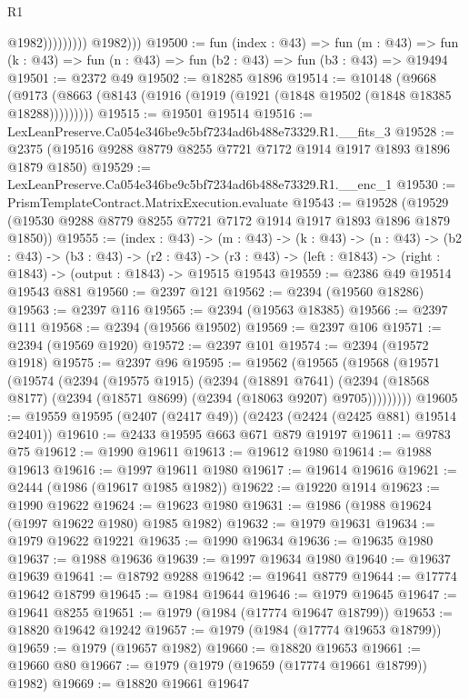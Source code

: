 \begin{lexlean}{R1}
\begin{coremodule}
                            @1982)))))))))
          @1982)))
@19500 := fun (index : @43) =>
  fun (m : @43) => fun (k : @43) => fun (n : @43) => fun (b2 : @43) => fun (b3 : @43) => @19494
@19501 := @2372 @49
@19502 := @18285 @1896
@19514 := @10148
    (@9668 (@9173 (@8663 (@8143 (@1916 (@1919 (@1921 (@1848 @19502 (@1848 @18385 @18288)))))))))
@19515 := @19501 @19514
@19516 := LexLeanPreserve.Ca054e346be9c5bf7234ad6b488e73329.R1.__fits_3
@19528 := @2375 (@19516 @9288 @8779 @8255 @7721 @7172 @1914 @1917 @1893 @1896 @1879 @1850)
@19529 := LexLeanPreserve.Ca054e346be9c5bf7234ad6b488e73329.R1.__enc_1
@19530 := PrismTemplateContract.MatrixExecution.evaluate
@19543 := @19528 (@19529 (@19530 @9288 @8779 @8255 @7721 @7172 @1914 @1917 @1893 @1896 @1879 @1850))
@19555 := (index : @43) ->
  (m : @43) ->
  (k : @43) ->
  (n : @43) ->
  (b2 : @43) ->
  (b3 : @43) ->
  (r2 : @43) -> (r3 : @43) -> (left : @1843) -> (right : @1843) -> (output : @1843) -> @19515 @19543
@19559 := @2386 @49 @19514 @19543 @881
@19560 := @2397 @121
@19562 := @2394 (@19560 @18286)
@19563 := @2397 @116
@19565 := @2394 (@19563 @18385)
@19566 := @2397 @111
@19568 := @2394 (@19566 @19502)
@19569 := @2397 @106
@19571 := @2394 (@19569 @1920)
@19572 := @2397 @101
@19574 := @2394 (@19572 @1918)
@19575 := @2397 @96
@19595 := @19562
    (@19565
      (@19568
        (@19571
          (@19574
            (@2394
              (@19575 @1915)
              (@2394
                (@18891 @7641)
                (@2394 (@18568 @8177) (@2394 (@18571 @8699) (@2394 (@18063 @9207) @9705)))))))))
@19605 := @19559 @19595 (@2407 (@2417 @49)) (@2423 (@2424 (@2425 @881) @19514 @2401))
@19610 := @2433 @19595 @663 @671 @879 @19197
@19611 := @9783 @75
@19612 := @1990 @19611
@19613 := @19612 @1980
@19614 := @1988 @19613
@19616 := @1997 @19611 @1980
@19617 := @19614 @19616
@19621 := @2444 (@1986 (@19617 @1985 @1982))
@19622 := @19220 @1914
@19623 := @1990 @19622
@19624 := @19623 @1980
@19631 := @1986 (@1988 @19624 (@1997 @19622 @1980) @1985 @1982)
@19632 := @1979 @19631
@19634 := @1979 @19622 @19221
@19635 := @1990 @19634
@19636 := @19635 @1980
@19637 := @1988 @19636
@19639 := @1997 @19634 @1980
@19640 := @19637 @19639
@19641 := @18792 @9288
@19642 := @19641 @8779
@19644 := @17774 @19642 @18799
@19645 := @1984 @19644
@19646 := @1979 @19645
@19647 := @19641 @8255
@19651 := @1979 (@1984 (@17774 @19647 @18799))
@19653 := @18820 @19642 @19242
@19657 := @1979 (@1984 (@17774 @19653 @18799))
@19659 := @1979 (@19657 @1982)
@19660 := @18820 @19653
@19661 := @19660 @80
@19667 := @1979 (@1979 (@19659 (@17774 @19661 @18799)) @1982)
@19669 := @18820 @19661 @19647

\end{coremodule}
\end{lexlean}
